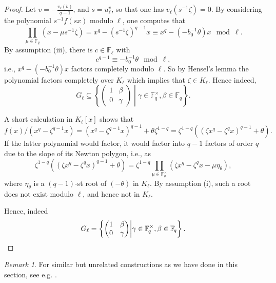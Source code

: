 \documentclass[10pt,a4paper]{amsart}
\theoremstyle{plain} %
\theoremstyle{definition}
\theoremstyle{remark}
\newtheorem{Remark}[Theorem]{Remark}
\newcommand{\FF}{\mathbb{F}}
\newcommand{\Fq}{\FF_{\!q}}  %
\numberwithin{equation}{subsection}
\begin{document}
\begin{proof}
Let $v=-\frac{v_\ell(b)}{q-1}$, and $s=u_\ell^v$, so that one has $v_\ell(s^{-1}\zeta)=0$. By considering the polynomial $s^{-1}f(sx)$ modulo $\ell$, one computes that 
\[  \prod_{\mu\in \Fq} (x-\mu s^{-1}\zeta) = x^q-(s^{-1}\zeta)^{q-1}x \equiv x^q - (-b_0^{-1}\theta)x \mod{\ell}. \]
By assumption (iii), there is $c\in \FF_\ell$ with \[ c^{q-1}\equiv -b_0^{-1}\theta \mod{\ell},\]
i.e., $x^q-(-b_0^{-1}\theta)x$ factors completely modulo $\ell$. So  by Hensel's lemma the polynomial factors completely over $K_\ell$ which implies that $\zeta\in K_\ell$. Hence indeed,
\[ G_\ell \subseteq \left\{ \begin{pmatrix} 1 & \beta \\ 0 & \gamma \end{pmatrix} \middle| \gamma\in \Fq^\times, \beta\in \Fq \right\}. \]

A short calculation in $K_\ell[x]$ shows that
\[ f(x)/(x^q-\zeta^{q-1} x) = \left(x^q-\zeta^{q-1}x\right)^{q-1} +\theta \zeta^{1-q} = \zeta^{1-q}\left( \left( \zeta x^q-\zeta^q x \right)^{q-1}   +\theta \right).  \]
If the latter polynomial would factor, it would factor into $q-1$ factors of order $q$ due to the slope of its Newton polygon, i.e., as
\[ \zeta^{1-q}\left( \left( \zeta x^q-\zeta^q x \right)^{q-1}   +\theta \right) =\zeta^{1-q} \prod_{\mu\in \Fq^\times} \left( \zeta x^q-\zeta^q x -\mu \eta_\theta \right),    \]
where $\eta_\theta$ is a $(q-1)$-st root of $(-\theta)$ in $K_\ell$.
By assumption (i), such a root does not exist modulo $\ell$, and hence not in $K_\ell$.

Hence, indeed
\begin{equation*}
    G_\ell = \left\{ \begin{pmatrix} 1 & \beta \\ 0 & \gamma \end{pmatrix} \middle| \gamma\in \Fq^\times, \beta\in \Fq \right\}. \qedhere
\end{equation*} 
\end{proof}

\begin{Remark}
    For similar but unrelated constructions as we have done in this section, see e.g. \cite{ar:tgrspddm, dz:dmmgatp,  nk-ds:ostgrdmr, ld-jf:grptdmgc}.
    
\end{Remark}
\end{document}
